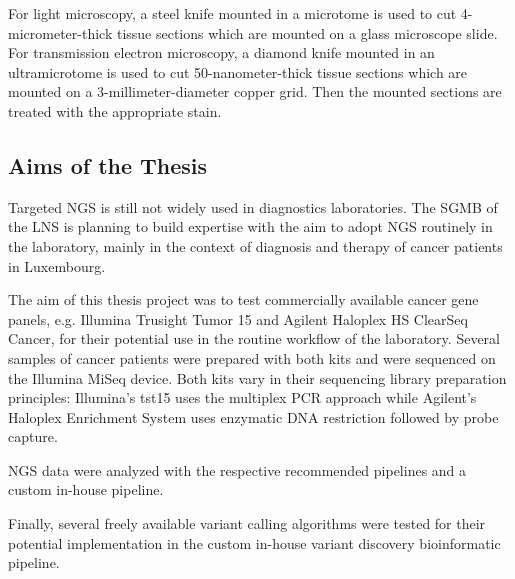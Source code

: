 For light microscopy, a steel knife mounted in a microtome is used to cut
4-micrometer-thick tissue sections which are mounted on a glass microscope
slide. For transmission electron microscopy, a diamond knife mounted in an
ultramicrotome is used to cut 50-nanometer-thick tissue sections which are
mounted on a 3-millimeter-diameter copper grid. Then the mounted sections are
treated with the appropriate stain.

\subsection{Aims of the Thesis}
Targeted NGS is still not widely used in diagnostics laboratories. The SGMB of the LNS
is planning to build expertise with the aim to adopt NGS routinely in the laboratory,
mainly in the context of diagnosis and therapy of cancer patients in Luxembourg.

The aim of this thesis project was to test commercially available cancer gene panels,
e.g. Illumina Trusight Tumor 15 and Agilent Haloplex HS ClearSeq Cancer, for their
potential use in the routine workflow of the laboratory. Several samples of cancer
patients were prepared with both kits and were sequenced on the Illumina MiSeq device.
Both kits vary in their sequencing library preparation principles: Illumina's tst15
uses the multiplex PCR approach while Agilent's Haloplex Enrichment System uses
enzymatic DNA restriction followed by probe capture.

NGS data were analyzed with the respective recommended pipelines and a custom in-house
pipeline.

Finally, several freely available variant calling algorithms were tested for their
potential implementation in the custom in-house variant discovery bioinformatic
pipeline.
